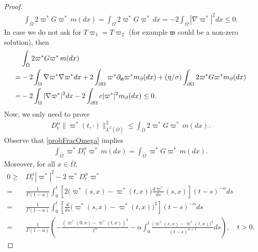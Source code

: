 \documentclass[11pt,a4paper]{article}
\newcommand{\magenta}{black}
\begin{document}
\begin{proof}
\begin{align*}
\int_{\bar{\Omega}} 2 \varpi^* G \varpi^*\, m(dx) = \int_{\Omega} 2 \varpi^* G \varpi^*\, dx = - 2 \int_\Omega |\nabla \varpi^* |^2 dx \leq 0.
\end{align*}
In case we do not ask for $T\varpi_1 = T \varpi_2$ (for example $\mathfrak{w}$ could be a non-zero solution), then
\begin{align*}
& \int_{\bar{\Omega}} 2 \varpi^* G \varpi^*\, m(dx) \\
= & - 2 \int_{\Omega} \nabla \varpi^* \nabla \varpi^* dx + 2 \int_{\partial \Omega} \varpi^* \partial_{\bf n} \varpi^* m_\partial(dx)  + (\eta/\sigma) \int_{\partial \Omega} 2 \varpi^* G \varpi^* m_\partial(dx)\\
= &  - 2\int_{\Omega} |\nabla \varpi^*|^2 dx - 2 \int_{\partial \Omega} c|\varpi^*|^2 m_\partial(dx) \leq 0 . 
\end{align*} 
{\color{\magenta} Now, we only need to prove 
\begin{align}
D^\alpha_t \| \varpi^*(t, \cdot) \|^2_{L^2(\bar{\Omega})} \leq  \int_{\bar{\Omega}} 2 \varpi^* G \varpi^*\, m(dx).
\label{OnlyNeedToProve}
\end{align}}
Observe that \eqref{probFracOmega} implies
 \begin{align*}
 \int_{\bar{\Omega}} \varpi^* D^\alpha_t \varpi^*\, m(dx) = \int_{\bar{\Omega}} \varpi^* G \varpi^*\, m(dx).
 \end{align*}
 Moreover, for all $x \in \bar{\Omega}$, 
 \begin{align*}
	0 \geq & D^\alpha_t | \varpi^* |^2 - 2\varpi^* D^\alpha_t \varpi^* \\ 
	= & \frac{1}{\Gamma(1-\alpha)} \int_0^t  \left[ 2\bigg(\varpi^*(s,x) - \varpi^*(t,x) \bigg) \frac{d \varpi^*}{d s}(s,x) \right] (t-s)^{-\alpha} ds\\
	= & \frac{1}{\Gamma(1-\alpha)} \int_0^t  \left[ \frac{d}{d s} \bigg(\varpi^*(s,x) - \varpi^*(t,x) \bigg)^2  \right] (t-s)^{-\alpha} ds\\
	= & \frac{1}{\Gamma(1-\alpha)} \left( - \frac{(\varpi^*(0,x) - \varpi^*(t,x))^2}{t^\alpha} -\alpha \int_0^t \frac{\big(\varpi^*(s,x) - \varpi^*(t,x) \big)^2}{(t-s)^{\alpha+1}} ds \right), \quad t>0.
 \end{align*}

\end{proof}
\end{document}
